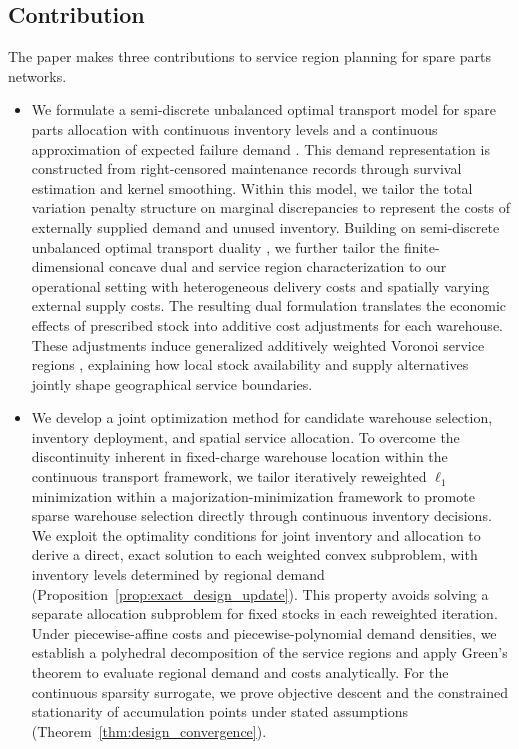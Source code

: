 \documentclass[a4paper,fleqn]{cas-sc}
\theoremstyle{remark}
\theoremstyle{plain}
\begin{document}
\subsection{Contribution}\label{subsec:contribution}

The paper makes three contributions to service region planning for spare parts networks.

\begin{itemize}
    \item
    We formulate a semi-discrete unbalanced optimal transport model for spare parts allocation with continuous inventory levels and a continuous approximation of expected failure demand \citep{ansari2018advancements}. This demand representation is constructed from right-censored maintenance records through survival estimation and kernel smoothing. Within this model, we tailor the total variation penalty structure on marginal discrepancies to represent the costs of externally supplied demand and unused inventory. Building on semi-discrete unbalanced optimal transport duality \citep{chungunbalanced}, we further tailor the finite-dimensional concave dual and service region characterization to our operational setting with heterogeneous delivery costs and spatially varying external supply costs. The resulting dual formulation translates the economic effects of prescribed stock into additive cost adjustments for each warehouse. These adjustments induce generalized additively weighted Voronoi service regions \citep{carlsson2026equitable}, explaining how local stock availability and supply alternatives jointly shape geographical service boundaries.

    \item
    We develop a joint optimization method for candidate warehouse selection, inventory deployment, and spatial service allocation. To overcome the discontinuity inherent in fixed-charge warehouse location within the continuous transport framework, we tailor iteratively reweighted $\ell_1$ minimization within a majorization-minimization framework \citep{realrojas2026rapid} to promote sparse warehouse selection directly through continuous inventory decisions. We exploit the optimality conditions for joint inventory and allocation to derive a direct, exact solution to each weighted convex subproblem, with inventory levels determined by regional demand (Proposition~\ref{prop:exact_design_update}). This property avoids solving a separate allocation subproblem for fixed stocks in each reweighted iteration. Under piecewise-affine costs and piecewise-polynomial demand densities, we establish a polyhedral decomposition of the service regions and apply Green's theorem to evaluate regional demand and costs analytically. For the continuous sparsity surrogate, we prove objective descent and the constrained stationarity of accumulation points under stated assumptions (Theorem~\ref{thm:design_convergence}).


\end{itemize}
\end{document}
